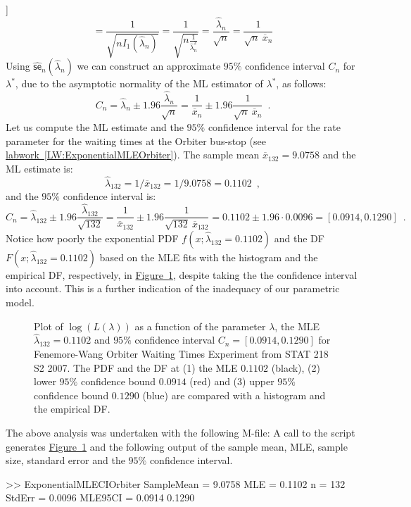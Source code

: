 \begin{example}[[Fisher Information of the $\exponential$ Experiment]]
\[= \frac{1}{\sqrt{n I_1(\widehat{\lambda}_n)}} 
= \frac{1}{\sqrt{n \frac{1}{\widehat{\lambda}_n^2} }}
= \frac{\widehat{\lambda}_n}{\sqrt{n}}
= \frac{1}{\sqrt{n} \ \overline{x}_n}
\]
Using $\widehat{\mathsf{se}}_n(\widehat{\lambda}_n)$ we can construct an approximate $95\%$ confidence interval $C_n$ for $\lambda^*$, due to the asymptotic normality of the ML estimator of $\lambda^*$, as follows:
\[
C_n 
= \widehat{\lambda}_n \pm 1.96 \frac{\widehat{\lambda}_n}{\sqrt{n}}
= \frac{1}{\overline{x}_n} \pm 1.96 \frac{1}{\sqrt{n} \ \overline{x}_n} \enspace .
\]
Let us compute the ML estimate and the $95\%$ confidence interval for the rate parameter for the waiting times at the Orbiter bus-stop (see \hyperref[LW:ExponentialMLEOrbiter]{labwork~\ref*{LW:ExponentialMLEOrbiter}}).  The sample mean $\overline{x}_{132}=9.0758$ and the ML estimate is:
$$\widehat{\lambda}_{132}=1/\overline{x}_{132}=1/9.0758=0.1102 \enspace ,$$
and the $95\%$ confidence interval is:  
\[
C_n 
= \widehat{\lambda}_{132} \pm 1.96 \frac{\widehat{\lambda}_{132}}{\sqrt{132}}
= \frac{1}{\overline{x}_{132}} \pm 1.96 \frac{1}{\sqrt{132} \ \overline{x}_{132}} = 0.1102 \pm 1.96 \cdot 0.0096 = [0.0914, 0.1290] \enspace .
\]
Notice how poorly the exponential PDF $f(x;\widehat{\lambda}_{132}=0.1102)$ and the DF $F(x;\widehat{\lambda}_{132}=0.1102)$ based on the MLE fits with the histogram and the empirical DF, respectively, in \hyperref[F:ExponentialMLECIOrbiter]{Figure~\ref*{F:ExponentialMLECIOrbiter}}, despite  taking the the confidence interval into account.  This is a further indication of the inadequacy of our parametric model.
\end{example}

\begin{figure}[htpb]
\caption{Plot of $\log(L(\lambda))$ as a function of the parameter $\lambda$, the MLE 
$\widehat{\lambda}_{132}=0.1102$ and $95\%$ confidence interval $C_n=[0.0914, 0.1290]$ for Fenemore-Wang Orbiter Waiting Times Experiment from STAT 218 S2 2007.  The PDF and the DF at (1) the MLE $0.1102$ (black), (2) lower $95\%$ confidence bound $0.0914$ (red) and (3) upper $95\%$ confidence bound $0.1290$ (blue) are compared with a histogram and the empirical DF.
\label{F:ExponentialMLECIOrbiter}}
\centering   {}
\end{figure}

\begin{labwork}\label{LW:ExponentialMLECIOrbiter}
The above analysis was undertaken with the following M-file:
A call to the script generates \hyperref[F:ExponentialMLECIOrbiter]{Figure~\ref*{F:ExponentialMLECIOrbiter}} and the following output of the sample mean, MLE, sample size, standard error and the $95\%$ confidence interval.  
\begin{VrbM}
>> ExponentialMLECIOrbiter
SampleMean =    9.0758
MLE =    0.1102
n =   132
StdErr =    0.0096
MLE95CI =    0.0914    0.1290
\end{VrbM}
\end{labwork}

